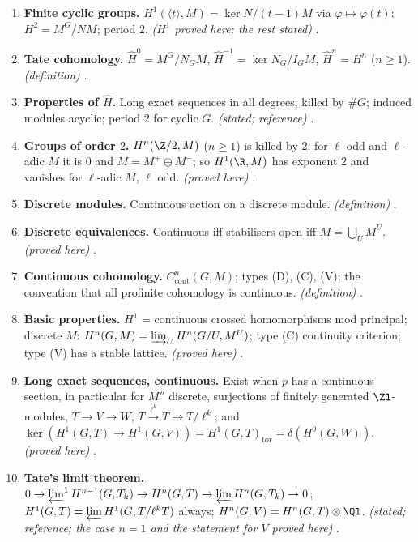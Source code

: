 \begin{enumerate}[label=\textbf{\thechapter.\arabic*}]
{reference)} .
\item \textbf{Finite cyclic groups.} $H^1(\langle t\rangle,M)=\ker N/(t-1)M$ via $\varphi\mapsto\varphi(t)$; $H^2=M^G/NM$; period $2$. \emph{($H^1$ proved here; the rest stated)}
.
\item \textbf{Tate cohomology.} $\hat H^0=M^G/N_GM$, $\hat H^{-1}=\ker N_G/I_GM$, $\hat H^n=H^n$ ($n\ge1$). \emph{(definition)} .
\item \textbf{Properties of $\hat H$.} Long exact sequences in all degrees; killed by $\#G$; induced modules acyclic; period $2$ for cyclic $G$. \emph{(stated; reference)}
.
\item \textbf{Groups of order $2$.} $H^n(\Z/2,M)$ ($n\ge1$) is killed by $2$; for $\ell$ odd and $\ell$-adic $M$ it is $0$ and $M=M^+\oplus M^-$; so $H^1(\R,M)$ has exponent $2$ and
vanishes for $\ell$-adic $M$, $\ell$ odd. \emph{(proved here)} .
\item \textbf{Discrete modules.} Continuous action on a discrete module. \emph{(definition)} .
\item \textbf{Discrete equivalences.} Continuous iff stabilisers open iff $M=\bigcup_UM^U$. \emph{(proved here)} .
\item \textbf{Continuous cohomology.} $C^n_{\mathrm{cont}}(G,M)$; types (D), (C), (V); the convention that all profinite cohomology is continuous. \emph{(definition)}
.
\item \textbf{Basic properties.} $H^1$ = continuous crossed homomorphisms mod principal; discrete $M$: $H^n(G,M)=\varinjlim_UH^n(G/U,M^U)$; type (C) continuity criterion; type (V)
has a stable lattice. \emph{(proved here)} .
\item \textbf{Long exact sequences, continuous.} Exist when $p$ has a continuous section, in particular for $M''$ discrete, surjections of finitely generated $\Zl$-modules,
$T\to V\to W$, $T\xrightarrow{\ell^k}T\to T/\ell^k$; and $\ker(H^1(G,T)\to H^1(G,V))=H^1(G,T)_{\mathrm{tor}}=\delta(H^0(G,W))$. \emph{(proved here)} .
\item \textbf{Tate's limit theorem.} $0\to\varprojlim^1H^{n-1}(G,T_k)\to H^n(G,T)\to\varprojlim H^n(G,T_k)\to0$; $H^1(G,T)=\varprojlim H^1(G,T/\ell^kT)$ always; $H^n(G,V)=H^n(G,T)\otimes\Ql$.
\emph{(stated; reference; the case $n=1$ and the statement for $V$ proved here)} .

\end{enumerate}
